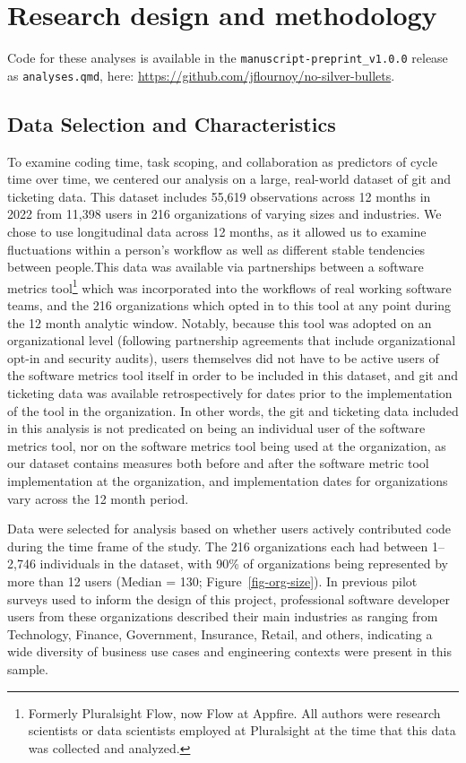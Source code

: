 \documentclass[
]{article}
\begin{document}
\section{Research design and
methodology}\label{research-design-and-methodology}

Code for these analyses is available in the
\texttt{manuscript-preprint\_v1.0.0} release as \texttt{analyses.qmd},
here: \url{https://github.com/jflournoy/no-silver-bullets}.

\subsection{Data Selection and
Characteristics}\label{data-selection-and-characteristics}

To examine coding time, task scoping, and collaboration as predictors of
cycle time over time, we centered our analysis on a large, real-world
dataset of git and ticketing data. This dataset includes 55,619
observations across 12 months in 2022 from 11,398 users in 216
organizations of varying sizes and industries. We chose to use
longitudinal data across 12 months, as it allowed us to examine
fluctuations within a person's workflow as well as different stable
tendencies between people.This data was available via partnerships
between a software metrics tool\footnote{Formerly Pluralsight Flow, now
  Flow at Appfire. All authors were research scientists or data
  scientists employed at Pluralsight at the time that this data was
  collected and analyzed.} which was incorporated into the workflows of
real working software teams, and the 216 organizations which opted in to
this tool at any point during the 12 month analytic window. Notably,
because this tool was adopted on an organizational level (following
partnership agreements that include organizational opt-in and security
audits), users themselves did not have to be active users of the
software metrics tool itself in order to be included in this dataset,
and git and ticketing data was available retrospectively for dates prior
to the implementation of the tool in the organization. In other words,
the git and ticketing data included in this analysis is not predicated
on being an individual user of the software metrics tool, nor on the
software metrics tool being used at the organization, as our dataset
contains measures both before and after the software metric tool
implementation at the organization, and implementation dates for
organizations vary across the 12 month period.

Data were selected for analysis based on whether users actively
contributed code during the time frame of the study. The 216
organizations each had between 1--2,746 individuals in the dataset, with
90\% of organizations being represented by more than 12 users (Median =
130; Figure~\ref{fig-org-size}). In previous pilot surveys used to
inform the design of this project, professional software developer users
from these organizations described their main industries as ranging from
Technology, Finance, Government, Insurance, Retail, and others,
indicating a wide diversity of business use cases and engineering
contexts were present in this sample.
\end{document}
